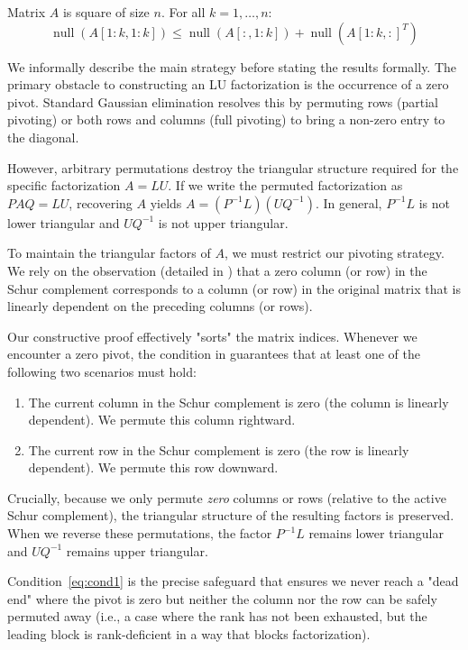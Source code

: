 \documentclass[10pt,twoside]{siamart1116}
\DeclareMathOperator{\nl}{null}
\numberwithin{theorem}{section}
\begin{document}
\begin{property}\label{prop:rank}
	Matrix $A$ is square of size $n$. For all $k = 1, \ldots, n$:
	\begin{equation}
		\label{eq:cond1}
		\nl(A[1:k,1:k]) \le \nl(A[:,1:k]) + \nl({A[1:k,:]}^T)
	\end{equation}
\end{property}

We informally describe the main strategy before stating the results formally. The primary obstacle to constructing an LU factorization is the occurrence of a zero pivot. Standard Gaussian elimination resolves this by permuting rows (partial pivoting) or both rows and columns (full pivoting) to bring a non-zero entry to the diagonal.

However, arbitrary permutations destroy the triangular structure required for the specific factorization $A=LU$. If we write the permuted factorization as $P A Q = L U$, recovering $A$ yields $A = (P^{-1} L) (U Q^{-1})$. In general, $P^{-1} L$ is not lower triangular and $U Q^{-1}$ is not upper triangular.

To maintain the triangular factors of $A$, we must restrict our pivoting strategy. We rely on the observation (detailed in ) that a zero column (or row) in the Schur complement corresponds to a column (or row) in the original matrix that is linearly dependent on the preceding columns (or rows).

Our constructive proof effectively "sorts" the matrix indices. Whenever we encounter a zero pivot, the condition in  guarantees that at least one of the following two scenarios must hold:
\begin{enumerate}
	\item The current column in the Schur complement is zero (the column is linearly dependent). We permute this column rightward.
	\item The current row in the Schur complement is zero (the row is linearly dependent). We permute this row downward.
\end{enumerate}

Crucially, because we only permute \emph{zero} columns or rows (relative to the active Schur complement), the triangular structure of the resulting factors is preserved. When we reverse these permutations, the factor $P^{-1} L$ remains lower triangular and $U Q^{-1}$ remains upper triangular.

Condition~\eqref{eq:cond1} is the precise safeguard that ensures we never reach a "dead end" where the pivot is zero but neither the column nor the row can be safely permuted away (i.e., a case where the rank has not been exhausted, but the leading block is rank-deficient in a way that blocks factorization).
\end{document}
